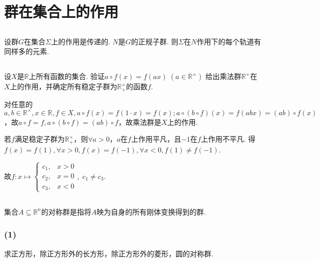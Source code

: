 \section{群在集合上的作用}
\subsection{}
设群$G$在集合$\Sigma $上的作用是传递的. $N$是$G$的正规子群. 则$\Sigma$在$N$作用下的每个轨道有同样多的元素.


\subsection{}
设$X$是$\mathbb{R}$上所有函数的集合. 验证$a\circ f(x)=f(ax)\;(a\in\mathbb{R}^{\times})$
给出乘法群$\mathbb{R}^{\times}$在$X$上的作用，并确定所有稳定子群为$\mathbb{R}_+^{\times}$的函数$f$.

\jie
对任意的$a,b\in\mathbb{R}^{\times}, x\in\mathbb{R}, f\in X, a\circ f(x)=f(1\cdot x)=f(x); a\circ (b\circ f)(x)=f(abx)=(ab)\circ f(x)$，故$a\circ f=f, a\circ(b\circ f)=(ab)\circ f$，故乘法群是$X$上的作用.

若$f$满足稳定子群为$\mathbb{R}_+^{\times}$，则$\forall a>0$，$a$在$f$上作用平凡，且$-1$在$f$上作用不平凡. 得$f(x)=f(1), \forall x>0, f(x)=f(-1), \forall x<0, f(1)\neq f(-1)$.

故$f: x\mapsto
\begin{cases}
c_1, & x>0\\
c_2, & x=0\\
c_3, & x<0
\end{cases}
,\;c_1\neq c_3.$

\subsection{}
集合$A\subseteq \mathbb{R}^n$的对称群是指将$A$映为自身的所有刚体变换得到的群.
\subsubsection{(1)}
求正方形，除正方形外的长方形，除正方形外的菱形，圆的对称群.

